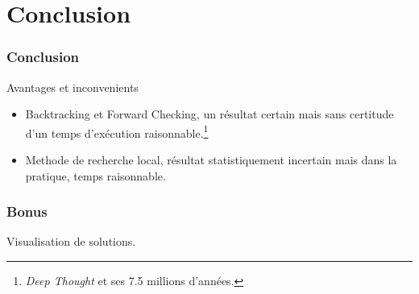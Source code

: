 \documentclass[9pt,a4paper]{beamer}
\begin{document}
\section{Conclusion}
\begin{frame}
	\frametitle{Conclusion}

	\begin{block}{Avantages et inconvenients}
	      \begin{itemize}
			\item{Backtracking et Forward Checking, un résultat certain mais sans certitude d'un temps d'exécution raisonnable.\footnote{\textit{Deep Thought} et ses 7.5 millions d'années.}}
			\item{Methode de recherche local, résultat statistiquement incertain mais dans la pratique, temps raisonnable.}
	      \end{itemize}

	\end{block}
\end{frame}

\begin{frame}
	\frametitle{Bonus}

	Visualisation de solutions.
\end{frame}
\end{document}
